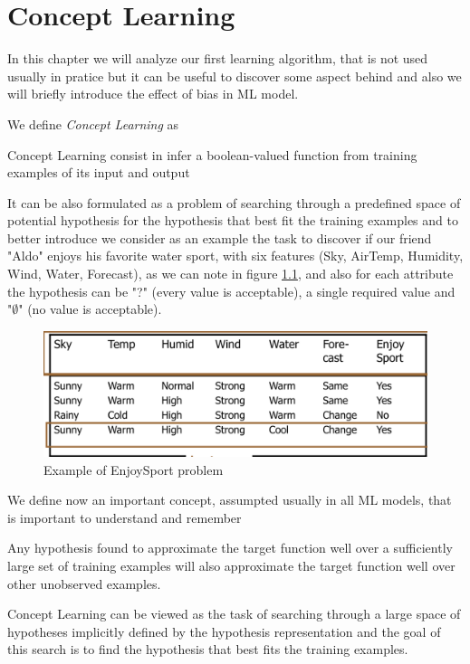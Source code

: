 \chapter{Concept Learning}
In this chapter we will analyze our first learning algorithm, that is not used usually in pratice but it can be useful to discover 
some aspect behind and also we will briefly introduce the effect of bias in ML model.

We define \emph{Concept Learning} as 
\begin{defi}
    Concept Learning consist in infer a boolean-valued function from training examples of its input and output
\end{defi}
It can be also formulated as a problem of searching through a predefined space of potential hypothesis for the hypothesis that best fit 
the training examples and to better introduce we consider as an example the task to discover if our friend "Aldo" enjoys his favorite water sport,
with six features (Sky, AirTemp, Humidity, Wind, Water, Forecast), as we can note in figure \ref{img:conceptExample}, and also for each attribute
the hypothesis can be "?" (every value is acceptable), a single required value and "$\emptyset$" (no value is acceptable).

\begin{figure}
    \caption{Example of EnjoySport problem}
    \label{img:conceptExample}
    \includegraphics[width=\textwidth]{images/enjoySport}
\end{figure}
We define now an important concept, assumpted usually in all ML models, that is important to understand and remember
\begin{defi}
    Any hypothesis found to approximate  the target function well over a sufficiently large set of training examples will also approximate the 
    target function well over other unobserved examples.
\end{defi}
Concept Learning can be viewed as the task of searching through a large space of hypotheses implicitly defined by the hypothesis representation and 
the goal of this search is to find the hypothesis that best fits the training examples.

